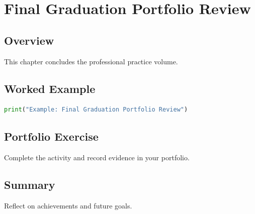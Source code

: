 \chapter{Final Graduation Portfolio Review}
\label{chap:vol15-10}



\section{Overview}
This chapter concludes the professional practice volume.

\section{Worked Example}
\begin{lstlisting}[language=Python]
print("Example: Final Graduation Portfolio Review")
\end{lstlisting}

\section{Portfolio Exercise}
Complete the activity and record evidence in your portfolio.

\section{Summary}
Reflect on achievements and future goals.
